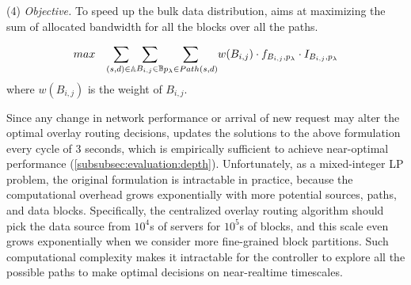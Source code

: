 
\noindent(4) {\em Objective.} To speed up the bulk data distribution, \name aims at maximizing the sum of allocated bandwidth for all the blocks over all the paths.

\begin{equation}
\centering
max \quad \displaystyle{\sum_{(s,d)\in \mathbb{A}}} \displaystyle{\sum_{B_{i,j} \in \mathbb{B}}} \displaystyle{\sum_{p_{\lambda}\in Path(s,d)}} w(B_{i,j})\cdot f_{B_{i,j},p_\lambda} \cdot I_{B_{i,j},p_\lambda}
\label{equation:objective}
\end{equation}
where $w(B_{i,j})$ is the weight of $B_{i,j}$.

Since any change in network performance or arrival of
new request may alter the optimal overlay
routing decisions,
\name updates the solutions to the above formulation every cycle of 3 seconds, which is empirically sufficient to achieve near-optimal performance (\Section\ref{subsubsec:evaluation:depth}). Unfortunately, as a mixed-integer LP problem, the original formulation is intractable in practice, because the computational overhead grows exponentially with more potential sources, paths, and data blocks. Specifically, the centralized overlay routing algorithm should pick the data source from $10^4$s of servers for $10^5$s of blocks, and this scale even grows exponentially when we consider more fine-grained block partitions. Such computational complexity makes it intractable for the controller to explore all the possible paths to make optimal decisions on near-realtime timescales.

